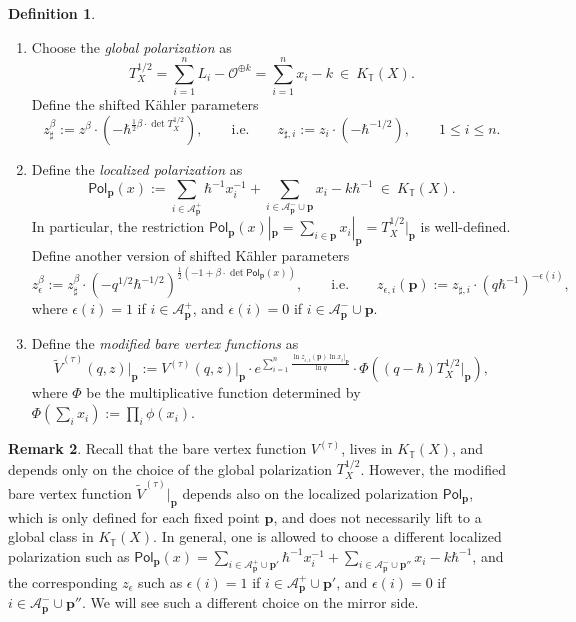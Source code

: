 \documentclass[10pt]{amsart}
\theoremstyle{definition}
\def\TT{\mathbb{T}}
\newcommand{\bp}{\mathbf{p}}
\newcommand{\cA}{\mathcal{A}}
\newcommand{\cO}{\mathcal{O}}
\newcommand{\Pol}{\mathsf{Pol}}
\theoremstyle{definition}
\newtheorem{Definition}{Definition}[section]
\newtheorem{Remark}[Definition]{Remark}
\numberwithin{equation}{section}
\theoremstyle{Theorem}
\begin{document}
\begin{Definition} \label{loc-pol}
\begin{enumerate}[1)]
	
\setlength{\parskip}{1ex}

\item Choose the \emph{global polarization} as
\begin{equation} \label{Polar-X}
T^{1/2}_X = \sum_{i=1}^n  L_i -  \cO^{\oplus k} = \sum_{i=1}^n x_i - k \ \in \ K_\TT (X).
\end{equation}
Define the shifted K\"ahler parameters
$$
z_\sharp^\beta := z^\beta \cdot (-\hbar^{ \frac{1}{2} \beta \cdot \det T^{1/2}_X }), \qquad \text{i.e.} \qquad  z_{\sharp, i} := z_i \cdot (-\hbar^{-1/2}), \qquad 1\leq i\leq n.
$$

\item Define the \emph{localized polarization} as
\begin{equation} \label{polarization}
\Pol_\bp (x) := \sum_{i\in \cA_\bp^+} \hbar^{-1} x_i^{-1} + \sum_{i\in \cA_\bp^- \cup \bp} x_i - k \hbar^{-1} \ \in \ K_\TT (X).
\end{equation}
In particular, the restriction $\Pol_\bp (x) |_\bp = \sum_{i\in \bp} x_i |_\bp = T_X^{1/2} |_\bp$ is well-defined. Define another version of shifted K\"ahler parameters
$$
z_\epsilon^\beta := z_\sharp^\beta \cdot (-q^{1/2} \hbar^{-1/2})^{\frac{1}{2} (-1+\beta \cdot \det \Pol_\bp (x) )}, \qquad \text{i.e.} \qquad  z_{\epsilon, i} (\bp) := z_{\sharp, i} \cdot (q\hbar^{-1})^{-\epsilon (i)},
$$
where $\epsilon (i) = 1$ if $i\in \cA_\bp^+$, and $\epsilon (i) = 0$ if $i\in \cA_\bp^- \cup \bp$.

\item Define the \emph{modified bare vertex functions} as
$$
\widetilde V^{(\tau)} (q,z) |_\bp := V^{(\tau)}(q,z) \big|_\bp \cdot e^{\sum_{i=1}^n \frac{\ln z_{\epsilon,i} (\bp) \ln x_i |_\bp }{\ln q} } \cdot \Phi ((q-\hbar) T_X^{1/2} |_\bp),
$$
where $\Phi$ be the multiplicative function determined by $\Phi(\sum_i x_i) := \prod_i \phi(x_i)$.
\end{enumerate}
\end{Definition}

\begin{Remark}
Recall that the bare vertex function $V^{(\tau)}$, lives in $K_\TT (X)$, and depends only on the choice of the global polarization $T_X^{1/2}$. However, the modified bare vertex function $\widetilde V^{(\tau)} |_\bp$ depends also on the localized polarization $\Pol_\bp$, which is only defined for each fixed point $\bp$, and does not necessarily lift to a global class in $K_\TT (X)$. In general, one is allowed to choose a different localized polarization such as $\Pol_\bp (x) = \sum_{i\in \cA_\bp^+ \cup \bp'} \hbar^{-1} x_i^{-1} + \sum_{i\in \cA_\bp^- \cup \bp''} x_i - k \hbar^{-1}$, and the corresponding $z_\epsilon$ such as $\epsilon (i) = 1$ if $i\in \cA_\bp^+ \cup \bp'$, and $\epsilon (i) = 0$ if $i\in \cA_\bp^- \cup \bp''$. We will see such a different choice on the mirror side.
\end{Remark}
\end{document}
